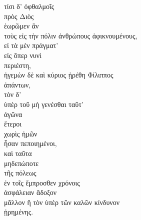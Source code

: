 {\large
\begin{greek}
\noindent τίσι δ' ὀφθαλμοῖς \\
\tabto{2em} πρὸς Διὸς \\
ἑωρῶμεν ἂν \\
τοὺς εἰς τὴν πόλιν ἀνθρώπους ἀφικνουμένους, \\
\tabto{2em} εἰ τὰ μὲν πράγματ' \\
\tabto{4em} εἰς ὅπερ νυνὶ \\
\tabto{2em} περιέστη, \\
\tabto{2em} ἡγεμὼν δὲ καὶ κύριος ᾑρέθη Φίλιππος \\
\tabto{4em} ἁπάντων, \\
\tabto{2em} τὸν δ' \\
\tabto{4em} ὑπὲρ τοῦ μὴ γενέσθαι ταῦτ' \\
\tabto{2em} ἀγῶνα \\
\tabto{2em} ἕτεροι \\
\tabto{4em} χωρὶς ἡμῶν \\
\tabto{2em} ἦσαν πεποιημένοι, \\

\tabto{2em} καὶ ταῦτα\\
\tabto{4em} μηδεπώποτε \\
\tabto{2em} τῆς πόλεως \\
\tabto{4em} ἐν τοῖς ἔμπροσθεν χρόνοις \\
\tabto{2em} ἀσφάλειαν ἄδοξον \\
\tabto{2em} μᾶλλον ἢ τὸν ὑπὲρ τῶν καλῶν κίνδυνον \\
\tabto{2em} ᾑρημένης.\\

\end{greek}
}

